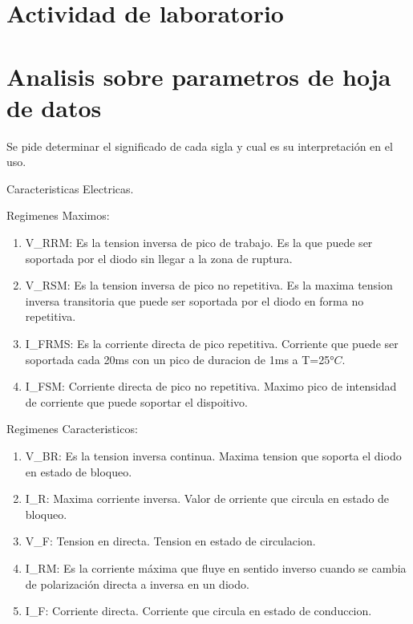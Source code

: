 \documentclass[chaptersright]{informeutn}
\begin{document}
        
    \chapter{Actividad de laboratorio}
    \chapter{Analisis sobre parametros de hoja de datos}

        Se pide  determinar el significado de cada sigla y cual es su interpretación en el uso.



        Caracteristicas Electricas.
        

        Regimenes Maximos:
        
        \begin{enumerate}
            \item V_RRM: Es la tension inversa de pico de trabajo. Es la que puede ser soportada por el diodo sin llegar a la zona de ruptura.
            \item V_RSM: Es la tension inversa de pico no repetitiva. Es la maxima tension inversa transitoria que puede ser soportada  por el diodo en forma no repetitiva.
            \item I_FRMS: Es la corriente directa de pico repetitiva. Corriente que puede ser soportada cada 20ms con un pico de duracion de 1ms a T=25$°C$.
            \item I_FSM: Corriente directa de pico no repetitiva. Maximo pico de intensidad de corriente que puede soportar el dispoitivo.
        \end{enumerate}



        Regimenes Caracteristicos:

        \begin{enumerate}
            \item V_BR: Es la tension inversa continua. Maxima tension que soporta el diodo en estado de bloqueo.
            \item I_R: Maxima corriente inversa. Valor de orriente que circula en estado de bloqueo.
            \item V_F: Tension en directa. Tension en estado de circulacion.
            \item I_RM: Es la corriente máxima que fluye en sentido inverso cuando se cambia de polarización directa a inversa en un diodo. 
            \item I_F: Corriente directa. Corriente que circula en estado de conduccion.
        \end{enumerate}
\end{document}
